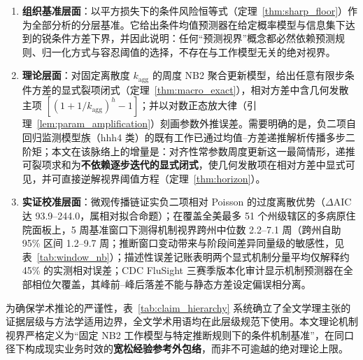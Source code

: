\documentclass[10pt,UTF8,a4paper,zihao=-4]{ctexart}
\theoremstyle{plain}
\theoremstyle{remark}
\begin{document}
\begin{enumerate}
\item \textbf{组织基准层面}：以平方损失下的条件风险恒等式（定理~\ref{thm:sharp_floor}）作为全部分析的分层基准。它给出条件均值预测器在给定概率模型与信息集下达到的锐条件方差下界，并因此说明：任何“预测视界”概念都必然依赖预测规则、归一化方式与容忍阈值的选择，不存在与工作模型无关的绝对视界。
\item \textbf{理论层面}：对固定离散度 $k_{\text{agg}}$ 的周度 NB2 聚合更新模型，给出任意有限步条件方差的显式裂项闭式（定理~\ref{thm:macro_exact}），相对方差中含几何发散主项 $[(1+1/k_{\text{agg}})^h-1]$；并以对数正态放大律（引理~\ref{lem:param_amplification}）刻画参数外推误差。需要明确的是，负二项自回归监测模型族（hhh4 类）的既有工作已通过均值--方差递推解析传播多步二阶矩\citep{held2005statistical, held2017monitoring, bracher2022endemic}；本文在该脉络上的增量是：对齐性常参数周度更新这一最简情形，递推可裂项求和为\textbf{不依赖逐步迭代的显式闭式}，使几何发散项在相对方差中显式可见，并可直接逆解视界阈值方程（定理~\ref{thm:horizon}）。
\item \textbf{实证校准层面}：微观传播链证实负二项相对 Poisson 的过度离散优势（$\Delta\text{AIC}$ 达 93.9--244.0，属相对拟合命题）；在覆盖全美最多 51 个州级辖区的多病原住院面板上，5 周基准窗口下测得机制视界跨州中位数 2.2--7.1 周（跨州自助 95\% 区间 1.2--9.7 周；推断窗口变动带来与阶段间差异同量级的敏感性，见表~\ref{tab:window_nb}）；描述性误差记账表明两个显式机制分量平均仅解释约 45\% 的实测相对误差；CDC FluSight 三赛季版本化审计显示机制预测器在全部相位欠覆盖，其峰前--峰后落差不能与静态方差设定偏误相分离。
\end{enumerate}

为确保学术推论的严谨性，表~\ref{tab:claim_hierarchy} 系统确立了全文学理主张的证据层级与方法学适用边界，全文学术用语均在此层级规范下使用。本文理论机制视界严格定义为“固定 NB2 工作模型与特定推断规则下的条件机制基准”，在同口径下构成现实业务时效的\textbf{宽松经验参考外包络}，而非不可逾越的绝对理论上限。
\end{document}
